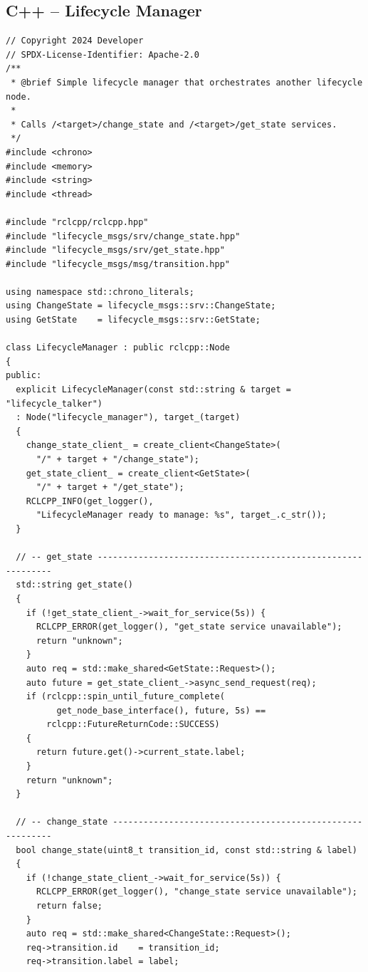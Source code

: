 \documentclass[12pt,a4paper]{article}
\begin{document}
\subsection{C++ -- Lifecycle Manager}

\begin{lstlisting}[style=cpp,caption={src/lifecycle\_manager.cpp}]
// Copyright 2024 Developer
// SPDX-License-Identifier: Apache-2.0
/**
 * @brief Simple lifecycle manager that orchestrates another lifecycle node.
 *
 * Calls /<target>/change_state and /<target>/get_state services.
 */
#include <chrono>
#include <memory>
#include <string>
#include <thread>

#include "rclcpp/rclcpp.hpp"
#include "lifecycle_msgs/srv/change_state.hpp"
#include "lifecycle_msgs/srv/get_state.hpp"
#include "lifecycle_msgs/msg/transition.hpp"

using namespace std::chrono_literals;
using ChangeState = lifecycle_msgs::srv::ChangeState;
using GetState    = lifecycle_msgs::srv::GetState;

class LifecycleManager : public rclcpp::Node
{
public:
  explicit LifecycleManager(const std::string & target = "lifecycle_talker")
  : Node("lifecycle_manager"), target_(target)
  {
    change_state_client_ = create_client<ChangeState>(
      "/" + target + "/change_state");
    get_state_client_ = create_client<GetState>(
      "/" + target + "/get_state");
    RCLCPP_INFO(get_logger(),
      "LifecycleManager ready to manage: %s", target_.c_str());
  }

  // -- get_state -------------------------------------------------------------
  std::string get_state()
  {
    if (!get_state_client_->wait_for_service(5s)) {
      RCLCPP_ERROR(get_logger(), "get_state service unavailable");
      return "unknown";
    }
    auto req = std::make_shared<GetState::Request>();
    auto future = get_state_client_->async_send_request(req);
    if (rclcpp::spin_until_future_complete(
          get_node_base_interface(), future, 5s) ==
        rclcpp::FutureReturnCode::SUCCESS)
    {
      return future.get()->current_state.label;
    }
    return "unknown";
  }

  // -- change_state ----------------------------------------------------------
  bool change_state(uint8_t transition_id, const std::string & label)
  {
    if (!change_state_client_->wait_for_service(5s)) {
      RCLCPP_ERROR(get_logger(), "change_state service unavailable");
      return false;
    }
    auto req = std::make_shared<ChangeState::Request>();
    req->transition.id    = transition_id;
    req->transition.label = label;


\end{lstlisting}
\end{document}
